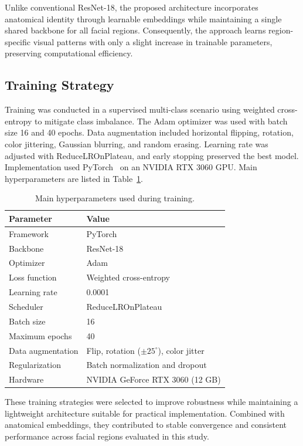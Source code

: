 \documentclass[conference]{IEEEtran}
\begin{document}
Unlike conventional ResNet-18, the proposed architecture incorporates anatomical identity through learnable embeddings while maintaining a single shared backbone for all facial regions. Consequently, the approach learns region-specific visual patterns with only a slight increase in trainable parameters, preserving computational efficiency.

\subsection{Training Strategy}
Training was conducted in a supervised multi-class scenario using weighted cross-entropy to mitigate class imbalance. The Adam optimizer was used with batch size 16 and 40 epochs. Data augmentation included horizontal flipping, rotation, color jittering, Gaussian blurring, and random erasing. Learning rate was adjusted with ReduceLROnPlateau, and early stopping preserved the best model. Implementation used PyTorch~\cite{paszke2019} on an NVIDIA RTX 3060 GPU. Main hyperparameters are listed in Table~\ref{tab:hyper}.

\begin{table}[!t]
\caption{Main hyperparameters used during training.}
\label{tab:hyper}
\centering
\begin{tabular}{ll}
\toprule
Parameter & Value \\
\midrule
Framework & PyTorch \\
Backbone & ResNet-18 \\
Optimizer & Adam \\
Loss function & Weighted cross-entropy \\
Learning rate & 0.0001 \\
Scheduler & ReduceLROnPlateau \\
Batch size & 16 \\
Maximum epochs & 40 \\
Data augmentation & Flip, rotation ($\pm25^\circ$), color jitter \\
Regularization & Batch normalization and dropout \\
Hardware & NVIDIA GeForce RTX 3060 (12 GB) \\
\bottomrule
\end{tabular}
\end{table}

These training strategies were selected to improve robustness while maintaining a lightweight architecture suitable for practical implementation. Combined with anatomical embeddings, they contributed to stable convergence and consistent performance across facial regions evaluated in this study.
\end{document}

